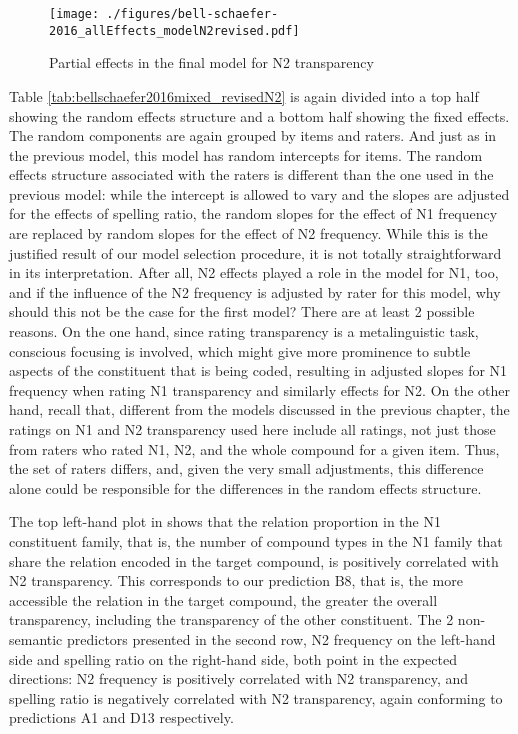 \begin{figure}[!htb]
  \centering
\texttt{[image: ./figures/bell-schaefer-2016\_allEffects\_modelN2revised.pdf]}
  \caption{Partial effects in the final model for N2 transparency}
\label{fig:bellschaefer2016_model_N2}
\end{figure}


Table \ref{tab:bellschaefer2016mixed_revisedN2} is again divided
into a top half showing the random effects structure and a bottom half
showing the fixed effects. The random components are again grouped by
items and raters. And just as in the previous model, this model has random intercepts
for items. The random effects structure associated with the raters is different
than the one used in the previous model: while the intercept is
allowed to vary and the slopes are adjusted for the effects of
spelling ratio, the random slopes for the effect of N1 frequency are replaced by  random
slopes for the effect of N2 frequency. While this is the
 justified result of our model selection procedure, it is not totally
 straightforward in its interpretation. After all, N2 effects played a
 role in the model for N1, too, and if the influence of the N2
 frequency is adjusted by rater for this model, why should this not
 be the case for the first model? There are at least 2 possible
 reasons. On the one hand, since rating transparency is a
 metalinguistic task, conscious focusing is involved, which might
 give more prominence to subtle aspects of the constituent that is being
 coded, resulting in adjusted slopes for N1 frequency when rating N1
 transparency and similarly effects for N2. On the other hand, recall
 that, different from the models discussed in the previous chapter,
 the ratings on N1 and N2 transparency used here include all ratings,
 not just those from raters who rated N1, N2, and the whole compound
 for a given item. Thus, the set of raters differs, and, given the
 very small adjustments, this difference alone could be responsible
 for the differences in the random effects structure.

The top left-hand plot in 
shows that the relation proportion in the N1 constituent family, that
is, the number of compound types in the N1 family that share the
relation encoded in the target compound, is positively correlated with
N2 transparency. This corresponds to our prediction B8, that is, the
more accessible the relation in the target compound, the greater the
overall transparency, including the transparency of the other
constituent. The 2 non-semantic predictors presented in the second
row, N2 frequency on the left-hand side and spelling ratio on the
right-hand side, both point in the expected directions: N2 frequency is positively correlated with N2 transparency, and spelling ratio is negatively correlated with N2 transparency, again conforming
to predictions A1 and D13 respectively.     


